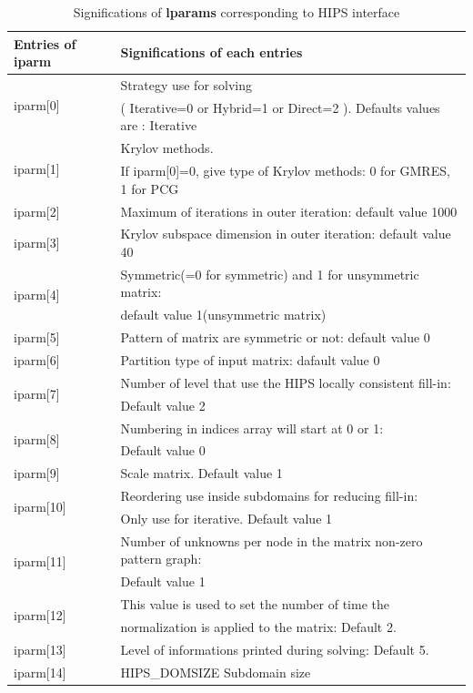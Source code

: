 \documentclass[a4paper,twoside,12pt]{book}
\begin{document}
\begin{table}[hbtp]
\begin{center}
\begin{tabular}{|l|l|}  \hline
\textbf{Entries of iparm } & \textbf{Significations of each entries} \\ \hline
\multirow{2}{*}{iparm[0] } &  Strategy use for solving \\ &
 ( Iterative=0 or Hybrid=1 or Direct=2 ). Defaults values are : Iterative \\
\hline
\multirow{2}{*}{iparm[1] } &  Krylov methods. \\ &   If iparm[0]=0, give type of
Krylov methods: 0 for GMRES, 1 for PCG \\ \hline
iparm[2] &  Maximum of iterations in outer iteration: default value 1000  \\
\hline
iparm[3] & Krylov subspace dimension in outer iteration: default value 40  \\
\hline

\multirow{2}{*}{iparm[4]} & Symmetric(=0 for symmetric) and 1 for  unsymmetric
matrix:  \\ & default value 1(unsymmetric matrix)   \\ \hline
iparm[5] &  Pattern of matrix are symmetric or not: default value 0 \\ \hline
iparm[6] & Partition type of input matrix: dafault value 0 \\ \hline
\multirow{2}{*}{iparm[7]} & Number of level that use the HIPS locally consistent
fill-in:\\ & Default value 2 \\ \hline
\multirow{2}{*}{iparm[8]} & Numbering in indices  array will start at 0 or 1:\\
& Default value 0 \\ \hline
iparm[9] & Scale matrix. Default value 1 \\ \hline
\multirow{2}{*}{iparm[10]} & Reordering use inside subdomains for reducing
fill-in:\\ & Only use for iterative.  Default value 1 \\ \hline
\multirow{2}{*}{iparm[11]} & Number of unknowns per node in the matrix non-zero
pattern graph: \\ & Default value 1 \\ \hline
\multirow{2}{*}{iparm[12]} & This value is used to set the number of time the
\\ & normalization is applied to the matrix: Default 2. \\ \hline
iparm[13] & Level of informations printed during solving: Default 5. \\ \hline
iparm[14] & HIPS\_DOMSIZE Subdomain size \\ \hline
\end{tabular}
\end{center}
\caption{Significations of \textbf{lparams} corresponding to HIPS interface }
\label{hipsinteger}
\end{table}
\end{document}
